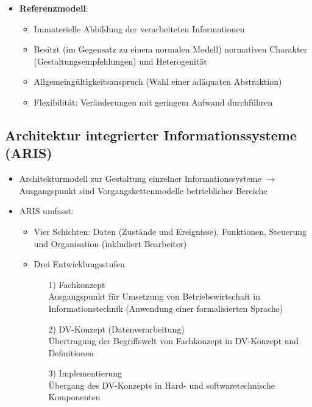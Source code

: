 \documentclass[12pt,a4paper]{article}
\begin{document}
\begin{itemize}
   \item \textbf{Referenzmodell}:
      \begin{itemize}
         \item Immaterielle Abbildung der verarbeiteten Informationen
         \item Besitzt (im Gegensatz zu einem normalen Modell) normativen Charakter (Gestaltungsempfehlungen) und Heterogenität
         \item Allgemeingültigkeitsanspruch (Wahl einer adäquaten Abstraktion)
         \item Flexibilität: Veränderungen mit geringem Aufwand durchführen
      \end{itemize}
\end{itemize}


\vspace{0.5cm}
\subsection{Architektur integrierter Informationssysteme (ARIS)} %
\begin{itemize}
   \item Architekturmodell zur Gestaltung einzelner Informationssysteme
          $\rightarrow$ Ausgangspunkt sind Vorgangskettenmodelle betrieblicher Bereiche
   \item ARIS umfasst:
      \begin{itemize}
        \item Vier Schichten: Daten (Zustände und Ereignisse), Funktionen, Steuerung und Organisation (inkludiert Bearbeiter)
        \item Drei Entwicklungsstufen
	        \begin{itemize}
	            \item[1)] Fachkonzept\\
	                  Ausgangspunkt für Umsetzung von Betriebswirtschaft in Informationstechnik
	                  (Anwendung einer formalisierten Sprache)
	            \item[2)] DV-Konzept (Datenverarbeitung)\\
	                  Übertragung der Begriffswelt von Fachkonzept in DV-Konzept und Definitionen
	            \item[3)] Implementierung\\
	                  Übergang des DV-Konzepts in Hard- und softwaretechnische Komponenten
	        \end{itemize}
      \end{itemize}
\end{itemize}
\end{document}
